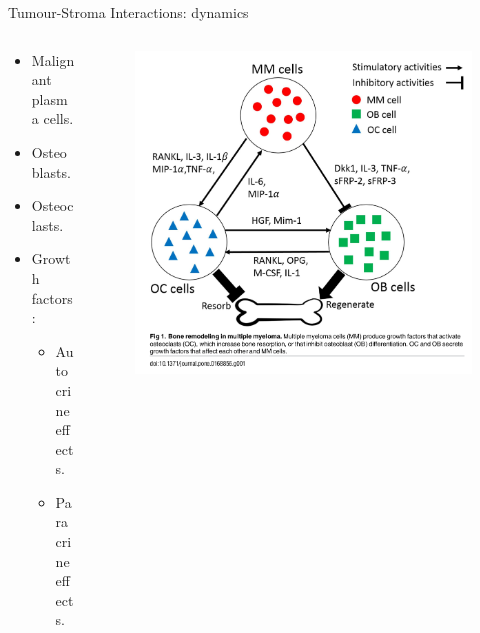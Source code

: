 \begin{frame}{Tumour-Stroma Interactions: dynamics}
    \begin{columns}
        \begin{column}{0.4\textwidth}
             \begin{itemize}
                \item Malignant plasma cells.
                \item Osteoblasts.
                \item Osteoclasts.
                \item Growth factors:
                \begin{itemize}
                    \item Autocrine effects.
                    \item Paracrine effects. 
                \end{itemize}
            \end{itemize}
        \end{column}
        \begin{column}{0.6 \textwidth}
            \begin{figure}[t]
                \includegraphics[width=0.9\linewidth]{img/tumour_stroma_interactions.png}
            \end{figure}
        \end{column}
    \end{columns}
\end{frame}



